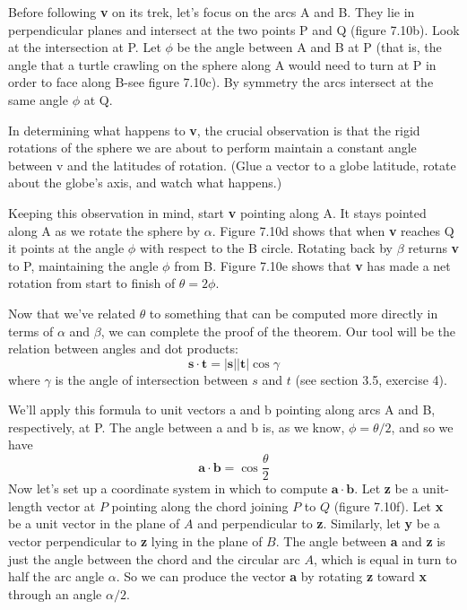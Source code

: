 \documentclass{book}
\begin{document}
Before following \textbf{v} on its trek, let's focus on the arcs A and B. They lie
in perpendicular planes and intersect at the two points P and Q (figure
7.10b). Look at the intersection at P. Let $\phi$ be the angle between A
and B at P (that is, the angle that a turtle crawling on the sphere along
A would need to turn at P in order to face along B-see figure 7.10c).
By symmetry the arcs intersect at the same angle $\phi$ at Q.

In determining what happens to \textbf{v}, the crucial observation is that
the rigid rotations of the sphere we are about to perform maintain a
constant angle between v and the latitudes of rotation. (Glue a vector to
a globe latitude, rotate about the globe's axis, and watch what happens.)

Keeping this observation in mind, start \textbf{v} pointing along A. It stays
pointed along A as we rotate the sphere by $\alpha$. Figure 7.10d shows that
when \textbf{v} reaches Q it points at the angle $\phi$ with respect to the B circle.
Rotating back by $\beta$ returns \textbf{v} to P, maintaining the angle $\phi$ from B.
Figure 7.10e shows that \textbf{v} has made a net rotation from start to finish
of $\theta = 2\phi$.

Now that we've related $\theta$ to something that can be computed more
directly in terms of $\alpha$ and $\beta$, we can complete the proof of the theorem.
Our tool will be the relation between angles and dot products:
$$\mathbf{s} \cdot \mathbf{t}= |\mathbf{s}| |\mathbf{t}| \cos \gamma$$
 where $\gamma$ is the angle of intersection between $s$ and $t$ (see section 3.5,
exercise 4).

We'll apply this formula to unit vectors a and b pointing along arcs
A and B, respectively, at P. The angle between a and b is, as we know,
$\phi = \theta / 2$, and so we have
$$\mathbf{a} \cdot \mathbf{b} = \cos \frac {\theta}{2} $$
 Now let's set up a coordinate system in which to compute $\mathbf{a} \cdot \mathbf{b}$. Let \textbf{z}
be a unit-length vector at $P$ pointing along the chord joining $P$ to $Q$
(figure 7.10f). Let \textbf{x} be a unit vector in the plane of $A$ and perpendicular
to \textbf{z}. Similarly, let \textbf{y} be a vector perpendicular to \textbf{z} lying in the plane of
$B$. The angle between \textbf{a} and \textbf{z} is just the angle between the chord and
the circular arc $A$, which is equal in turn to half the arc angle $\alpha$. So we
can produce the vector \textbf{a} by rotating \textbf{z} toward \textbf{x} through an angle $\alpha / 2$.
\end{document}
